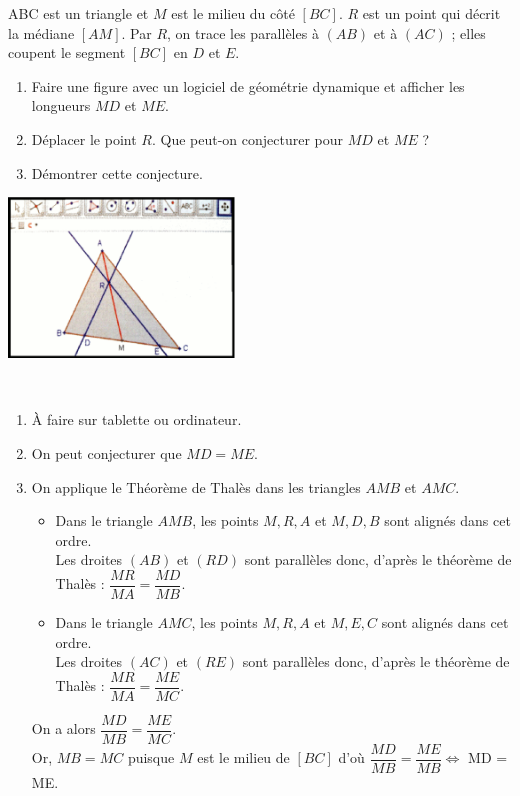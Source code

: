 \begin{exercice} %
   ABC est un triangle et $M$ est le milieu du côté $[BC]$. $R$ est un point qui décrit la médiane $[AM]$. Par $R$, on trace les parallèles à $(AB)$ et à $(AC)$ ; elles coupent le segment $[BC]$ en $D$ et $E$.
   \begin{enumerate}
      \item Faire une figure avec un logiciel de géométrie dynamique et afficher les longueurs $MD$ et $ME$.
      \item Déplacer le point $R$. Que peut-on conjecturer pour $MD$ et $ME$ ?
      \item Démontrer cette conjecture.   
   \end{enumerate}

\begin{center}
      \includegraphics[width=6cm]{Geometrie/Images/G11_ex_geogebra}
   \end{center}
\end{exercice}

\begin{corrige}
\ \\ [-5mm]
    \begin{enumerate}
      \item À faire sur tablette ou ordinateur.
      \item On peut conjecturer que {\blue $MD =ME$}.
      \item On applique le Théorème de Thalès dans les triangles $AMB$ et $AMC$.
      \begin{itemize}
         \item Dans le triangle $AMB$, les points $M, R, A$ et $M, D, B$ sont alignés dans cet ordre. \\ [1mm]
            Les droites $(AB)$ et $(RD)$ sont parallèles donc, d'après le théorème de Thalès : $\dfrac{MR}{MA} =\dfrac{MD}{MB}$. \smallskip
         \item Dans le triangle $AMC$, les points $M, R, A$ et $M, E, C$ sont alignés dans cet ordre. \\ [1mm]
            Les droites $(AC)$ et $(RE)$ sont parallèles donc, d'après le théorème de Thalès : $\dfrac{MR}{MA} =\dfrac{ME}{MC}$. \smallskip
      \end{itemize}
      On a alors $\dfrac{MD}{MB} =\dfrac{ME}{MC}$. \\
      Or, $MB =MC$ puisque $M$ est le milieu de $[BC]$ d'où $\dfrac{MD}{MB} =\dfrac{ME}{MB} \iff$ {\blue MD = ME}.
   \end{enumerate}
\end{corrige}

